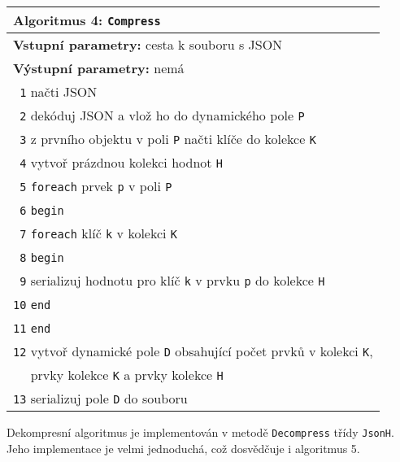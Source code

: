 \begin{table}[!h]
\centering
\begin{tabular}{|l|}
\hline
\textbf{Algoritmus 4:} \texttt{Compress}\\
\hline
\textbf{Vstupní parametry:} cesta k souboru s JSON\\
\textbf{Výstupní parametry:} nemá\\
\hline
\texttt{ 1} načti JSON\\
\texttt{ 2} dekóduj JSON a vlož ho do dynamického pole \texttt{P}\\
\texttt{ 3} z prvního objektu v poli \texttt{P} načti klíče do kolekce \texttt{K}\\
\texttt{ 4} vytvoř prázdnou kolekci hodnot \texttt{H}\\
\texttt{ 5} \texttt{foreach} prvek \texttt{p} v poli \texttt{P}\\
\texttt{ 6} \texttt{begin}\\
\texttt{ 7} \hspace*{5mm}\texttt{foreach} klíč \texttt{k} v kolekci \texttt{K}\\
\texttt{ 8} \hspace*{5mm}\texttt{begin}\\
\texttt{ 9} \hspace*{10mm}serializuj hodnotu pro klíč \texttt{k} v prvku \texttt{p} do kolekce \texttt{H}\\
\texttt{10} \hspace*{5mm}\texttt{end}\\
\texttt{11} \texttt{end}\\
\texttt{12} vytvoř dynamické pole \texttt{D} obsahující počet prvků v kolekci \texttt{K},\\
\verb+  + prvky kolekce \texttt{K} a prvky kolekce \texttt{H}\\
\texttt{13} serializuj pole \texttt{D} do souboru\\
\hline
\end{tabular}
\end{table}

Dekompresní algoritmus je implementován v metodě \texttt{Decompress} třídy \texttt{JsonH}. Jeho implementace je velmi jednoduchá, což dosvědčuje i algoritmus 5.

